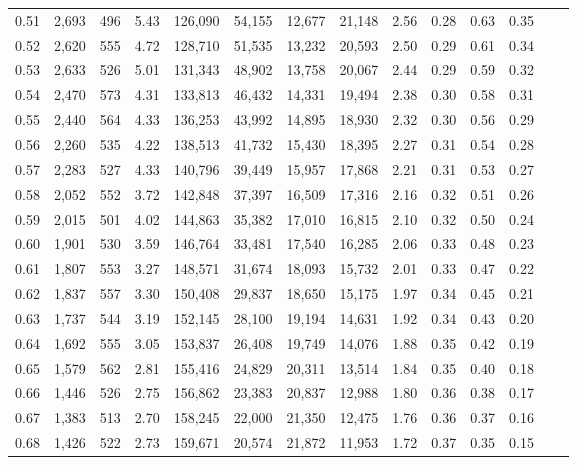\begin{tabular}{rrrrrrrrrrrrrr}
0.51 &  2,693 &  496 &    5.43 &  126,090 &   54,155 &  12,677 &  21,148 &  2.56 &  0.28 &  0.63 &      0.35 \\
0.52 &  2,620 &  555 &    4.72 &  128,710 &   51,535 &  13,232 &  20,593 &  2.50 &  0.29 &  0.61 &      0.34 \\
0.53 &  2,633 &  526 &    5.01 &  131,343 &   48,902 &  13,758 &  20,067 &  2.44 &  0.29 &  0.59 &      0.32 \\
0.54 &  2,470 &  573 &    4.31 &  133,813 &   46,432 &  14,331 &  19,494 &  2.38 &  0.30 &  0.58 &      0.31 \\
0.55 &  2,440 &  564 &    4.33 &  136,253 &   43,992 &  14,895 &  18,930 &  2.32 &  0.30 &  0.56 &      0.29 \\
0.56 &  2,260 &  535 &    4.22 &  138,513 &   41,732 &  15,430 &  18,395 &  2.27 &  0.31 &  0.54 &      0.28 \\
0.57 &  2,283 &  527 &    4.33 &  140,796 &   39,449 &  15,957 &  17,868 &  2.21 &  0.31 &  0.53 &      0.27 \\
0.58 &  2,052 &  552 &    3.72 &  142,848 &   37,397 &  16,509 &  17,316 &  2.16 &  0.32 &  0.51 &      0.26 \\
0.59 &  2,015 &  501 &    4.02 &  144,863 &   35,382 &  17,010 &  16,815 &  2.10 &  0.32 &  0.50 &      0.24 \\
0.60 &  1,901 &  530 &    3.59 &  146,764 &   33,481 &  17,540 &  16,285 &  2.06 &  0.33 &  0.48 &      0.23 \\
0.61 &  1,807 &  553 &    3.27 &  148,571 &   31,674 &  18,093 &  15,732 &  2.01 &  0.33 &  0.47 &      0.22 \\
0.62 &  1,837 &  557 &    3.30 &  150,408 &   29,837 &  18,650 &  15,175 &  1.97 &  0.34 &  0.45 &      0.21 \\
0.63 &  1,737 &  544 &    3.19 &  152,145 &   28,100 &  19,194 &  14,631 &  1.92 &  0.34 &  0.43 &      0.20 \\
0.64 &  1,692 &  555 &    3.05 &  153,837 &   26,408 &  19,749 &  14,076 &  1.88 &  0.35 &  0.42 &      0.19 \\
0.65 &  1,579 &  562 &    2.81 &  155,416 &   24,829 &  20,311 &  13,514 &  1.84 &  0.35 &  0.40 &      0.18 \\
0.66 &  1,446 &  526 &    2.75 &  156,862 &   23,383 &  20,837 &  12,988 &  1.80 &  0.36 &  0.38 &      0.17 \\
0.67 &  1,383 &  513 &    2.70 &  158,245 &   22,000 &  21,350 &  12,475 &  1.76 &  0.36 &  0.37 &      0.16 \\
0.68 &  1,426 &  522 &    2.73 &  159,671 &   20,574 &  21,872 &  11,953 &  1.72 &  0.37 &  0.35 &      0.15 \\

\end{tabular}
